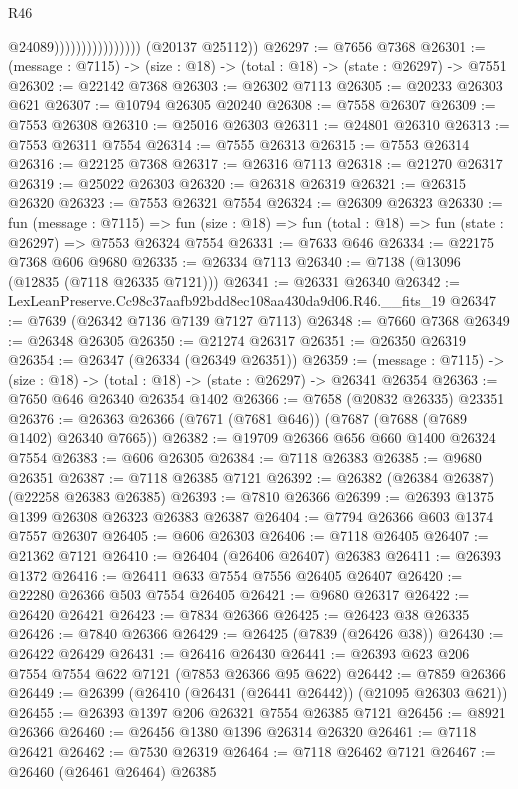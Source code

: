 \begin{lexlean}{R46}
\begin{coremodule}
                                      @24089))))))))))))))))
      (@20137 @25112))
@26297 := @7656 @7368
@26301 := (message : @7115) -> (size : @18) -> (total : @18) -> (state : @26297) -> @7551
@26302 := @22142 @7368
@26303 := @26302 @7113
@26305 := @20233 @26303 @621
@26307 := @10794 @26305 @20240
@26308 := @7558 @26307
@26309 := @7553 @26308
@26310 := @25016 @26303
@26311 := @24801 @26310
@26313 := @7553 @26311 @7554
@26314 := @7555 @26313
@26315 := @7553 @26314
@26316 := @22125 @7368
@26317 := @26316 @7113
@26318 := @21270 @26317
@26319 := @25022 @26303
@26320 := @26318 @26319
@26321 := @26315 @26320
@26323 := @7553 @26321 @7554
@26324 := @26309 @26323
@26330 := fun (message : @7115) =>
  fun (size : @18) => fun (total : @18) => fun (state : @26297) => @7553 @26324 @7554
@26331 := @7633 @646
@26334 := @22175 @7368 @606 @9680
@26335 := @26334 @7113
@26340 := @7138 (@13096 (@12835 (@7118 @26335 @7121)))
@26341 := @26331 @26340
@26342 := LexLeanPreserve.Cc98c37aafb92bdd8ec108aa430da9d06.R46.__fits_19
@26347 := @7639 (@26342 @7136 @7139 @7127 @7113)
@26348 := @7660 @7368
@26349 := @26348 @26305
@26350 := @21274 @26317
@26351 := @26350 @26319
@26354 := @26347 (@26334 (@26349 @26351))
@26359 := (message : @7115) -> (size : @18) -> (total : @18) -> (state : @26297) -> @26341 @26354
@26363 := @7650 @646 @26340 @26354 @1402
@26366 := @7658 (@20832 @26335) @23351
@26376 := @26363 @26366 (@7671 (@7681 @646)) (@7687 (@7688 (@7689 @1402) @26340 @7665))
@26382 := @19709 @26366 @656 @660 @1400 @26324 @7554
@26383 := @606 @26305
@26384 := @7118 @26383
@26385 := @9680 @26351
@26387 := @7118 @26385 @7121
@26392 := @26382 (@26384 @26387) (@22258 @26383 @26385)
@26393 := @7810 @26366
@26399 := @26393 @1375 @1399 @26308 @26323 @26383 @26387
@26404 := @7794 @26366 @603 @1374 @7557 @26307
@26405 := @606 @26303
@26406 := @7118 @26405
@26407 := @21362 @7121
@26410 := @26404 (@26406 @26407) @26383
@26411 := @26393 @1372
@26416 := @26411 @633 @7554 @7556 @26405 @26407
@26420 := @22280 @26366 @503 @7554 @26405
@26421 := @9680 @26317
@26422 := @26420 @26421
@26423 := @7834 @26366
@26425 := @26423 @38 @26335
@26426 := @7840 @26366
@26429 := @26425 (@7839 (@26426 @38))
@26430 := @26422 @26429
@26431 := @26416 @26430
@26441 := @26393 @623 @206 @7554 @7554 @622 @7121 (@7853 @26366 @95 @622)
@26442 := @7859 @26366
@26449 := @26399 (@26410 (@26431 (@26441 @26442)) (@21095 @26303 @621))
@26455 := @26393 @1397 @206 @26321 @7554 @26385 @7121
@26456 := @8921 @26366
@26460 := @26456 @1380 @1396 @26314 @26320
@26461 := @7118 @26421
@26462 := @7530 @26319
@26464 := @7118 @26462 @7121
@26467 := @26460 (@26461 @26464) @26385

\end{coremodule}
\end{lexlean}
